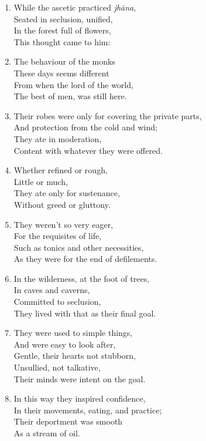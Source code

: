 \documentclass[10pt, openany]{book}
\newcommand*{\vleftofline}[1]{\leavevmode\llap{#1}}
\begin{document}
\begin{enumerate}
\item While the ascetic practiced \emph{jhāna},\\
Seated in seclusion, unified,\\
In the forest full of flowers,\\
This thought came to him:

\item \vleftofline{“}The behaviour of the monks\\
These days seems different\\
From when the lord of the world,\\
The best of men, was still here.

\item Their robes were only for covering the private parts,\\
And protection from the cold and wind;\\
They ate in moderation,\\
Content with whatever they were offered.

\item Whether refined or rough,\\
Little or much,\\
They ate only for sustenance,\\
Without greed or gluttony.

\item They weren’t so very eager,\\
For the requisites of life,\\
Such as tonics and other necessities,\\
As they were for the end of defilements.

\item In the wilderness, at the foot of trees,\\
In caves and caverns,\\
Committed to seclusion,\\
They lived with that as their final goal.

\item They were used to simple things, \\
And were easy to look after,\\
Gentle, their hearts not stubborn,\\
Unsullied, not talkative,\\
Their minds were intent on the goal.

\item In this way they inspired confidence,\\
 In their movements, eating, and practice;\\
Their deportment was smooth\\
As a stream of oil.


\end{enumerate}
\end{document}
